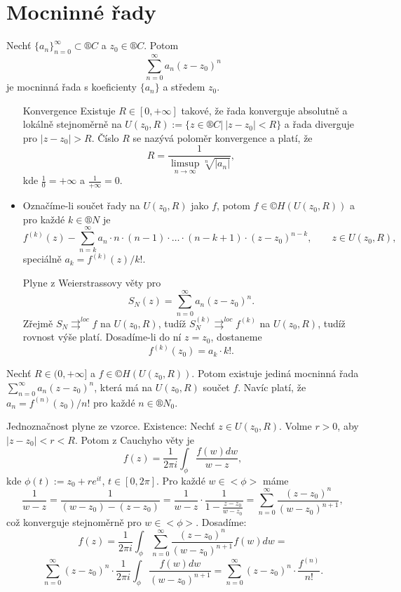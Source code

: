\documentclass[12pt]{article}					%
\begin{document}

\section{Mocninné řady}
\begin{definice}
	Nechť $\{a_n\}_{n=0}^∞ \subset ®C$ a $z_0 \in ®C$. Potom
	$$ \sum_{n=0}^∞ a_n (z - z_0)^n $$
	je mocninná řada s koeficienty $\{a_n\}$ a středem $z_0$.
\end{definice}

\begin{poznamka}[Vlastnosti]
	\begin{itemize}
		\item[Konvergence] Existuje $R \in [0, +∞]$ takové, že řada konverguje absolutně a lokálně stejnoměrně na $U(z_0, R) := \{z \in ®C |\ |z - z_0| < R\}$ a řada diverguje pro $|z - z_0| > R$. Číslo $R$ se nazývá poloměr konvergence a platí, že
			$$ R = \frac{1}{\limsup_{n\rightarrow ∞} \sqrt[n]{|a_n|}}, $$
			kde $\frac{1}{0} = +∞$ a $\frac{1}{+∞} = 0$.
		\item Označíme-li součet řady na $U(z_0, R)$ jako $f$, potom $f \in ©H(U(z_0, R))$ a pro každé $k \in ®N$ je
			$$ f^{(k)}(z) - \sum_{n=k}^∞a_n · n · (n-1) · … ·(n-k+1)·(z - z_0)^{n-k}, \qquad z \in U(z_0, R), $$
			speciálně $a_k = f^{(k)}(z) / k!$.
		
			Plyne z Weierstrassovy věty pro
			$$ S_N(z) = \sum_{n=0}^∞ a_n(z - z_0)^n. $$
			Zřejmě $S_N \rightrightarrows^{loc} f$ na $U(z_0, R)$, tudíž $S_N^{(k)} \rightrightarrows^{loc} f^{(k)}$ na $U(z_0, R)$, tudíž rovnost výše platí. Dosadíme-li do ní $z = z_0$, dostaneme
			$$ f^{(k)}(z_0) = a_k·k!. $$
	\end{itemize}
\end{poznamka}

\begin{veta}
	Nechť $R \in (0, +∞]$ a $f \in ©H(U(z_0, R))$. Potom existuje jediná mocninná řada $\sum_{n=0}^∞ a_n(z - z_0)^n$, která má na $U(z_0, R)$ součet $f$. Navíc platí, že $a_n = f^{(n)}(z_0) / n!$ pro každé $n \in ®N_0$.

	\begin{dukazin}
		Jednoznačnost plyne ze vzorce. Existence: Nechť $z \in U(z_0, R)$. Volme $r > 0$, aby $|z - z_0| < r < R$. Potom z Cauchyho věty je
		$$ f(z) = \frac{1}{2\pi i} \int_\phi \frac{f(w) dw}{w - z}, $$
		kde $\phi(t) := z_0 + r e^{i t}$, $t \in [0, 2\pi]$. Pro každé $w \in <\phi>$ máme
		$$ \frac{1}{w - z} = \frac{1}{(w - z_0) - (z - z_0)} = \frac{1}{w - z}·\frac{1}{1 - \frac{z - z_0}{w - z_0}} = \sum_{n=0}^∞ \frac{(z - z_0)^n}{(w - z_0)^{n+1}}, $$
		což konverguje stejnoměrně pro $w \in <\phi>$. Dosadíme:
		$$ f(z) = \frac{1}{2\pi i} \int_\phi \sum_{n=0}^∞ \frac{(z - z_0)^n}{(w - z_0)^{n+1}} f(w) dw = $$
		$$ \sum_{n=0}^∞ (z - z_0)^n · \frac{1}{2\pi i} \int_\phi \frac{f(w) dw}{(w - z_0)^{n+1}} = \sum_{n=0}^∞ (z - z_0)^n · \frac{f^{(n)}}{n!}. $$
	\end{dukazin}
\end{veta}
\end{document}
